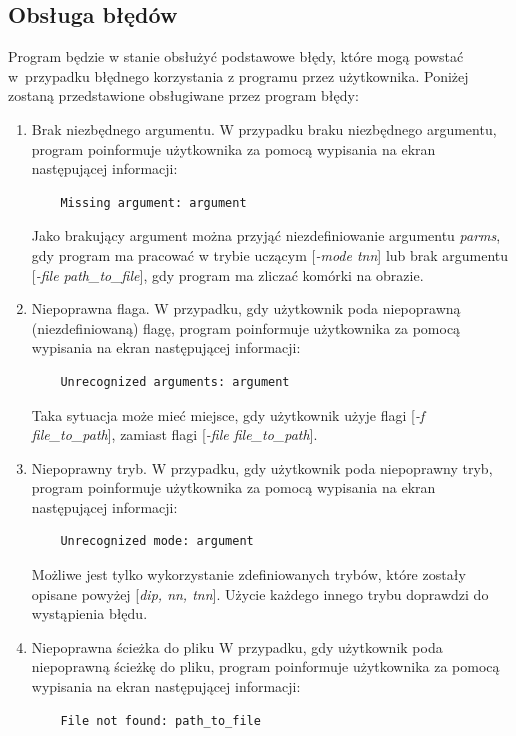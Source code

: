 \documentclass[a4paper]{article}
\begin{document}
\subsection{Obsługa błędów}
Program będzie w stanie obsłużyć podstawowe błędy, które mogą powstać w~przypadku błędnego korzystania z programu przez użytkownika. Poniżej zostaną przedstawione obsługiwane przez program błędy:
\begin{enumerate}
    \item Brak niezbędnego argumentu.
    \newline
    W przypadku braku niezbędnego argumentu, program poinformuje użytkownika za pomocą wypisania na ekran następującej informacji:
    \begin{verbatim}    Missing argument: argument\end{verbatim}
    Jako brakujący argument można przyjąć niezdefiniowanie argumentu \textit{parms}, gdy program ma pracować w trybie uczącym [\textit{-mode tnn}] lub brak argumentu [\textit{-file path\_to\_file}], gdy program ma zliczać komórki na obrazie.
    \item Niepoprawna flaga.
    \newline
    W przypadku, gdy użytkownik poda niepoprawną (niezdefiniowaną) flagę, program poinformuje użytkownika za pomocą wypisania na ekran następującej informacji:
    \begin{verbatim}    Unrecognized arguments: argument\end{verbatim}
    Taka sytuacja może mieć miejsce, gdy użytkownik użyje flagi [\textit{-f file\_to\_path}], zamiast flagi [\textit{-file file\_to\_path}].
    \item Niepoprawny tryb.
    \newline
    W przypadku, gdy użytkownik poda niepoprawny tryb, program poinformuje użytkownika za pomocą wypisania na ekran następującej informacji:
    \begin{verbatim}    Unrecognized mode: argument\end{verbatim}
    Możliwe jest tylko wykorzystanie zdefiniowanych trybów, które zostały opisane powyżej [\textit{dip, nn, tnn}]. Użycie każdego innego trybu doprawdzi do wystąpienia błędu.
    \item Niepoprawna ścieżka do pliku
    \newline
    W przypadku, gdy użytkownik poda niepoprawną ścieżkę do pliku, program poinformuje użytkownika za pomocą wypisania na ekran następującej informacji:
    \begin{verbatim}    File not found: path_to_file\end{verbatim}

\end{enumerate}
\end{document}
